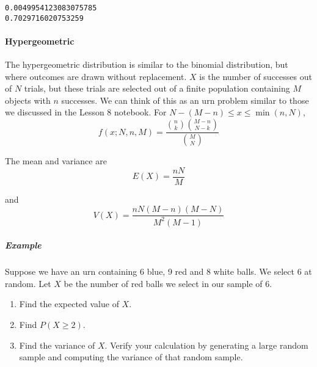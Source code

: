 \documentclass[11pt]{article}
\begin{document}
    \begin{Verbatim}[commandchars=\\\{\}]
0.0049954123083075785
0.7029716020753259

    \end{Verbatim}

    \paragraph{Hypergeometric}\label{hypergeometric}

The hypergeometric distribution is similar to the binomial distribution,
but where outcomes are drawn without replacement. \(X\) is the number of
successes out of \(N\) trials, but these trials are selected out of a
finite population containing \(M\) objects with \(n\) successes. We can
think of this as an urn problem similar to those we discussed in the
Lesson 8 notebook. For \(N-(M-n) \leq x \leq \min(n,N)\), \[
f(x;N,n,M)= \frac{{n\choose k}{{M-n}\choose {N-k}}}{M\choose N}
\]

The mean and variance are \[
E(X)=\frac{nN}{M}
\]

and \[
V(X)=\frac{nN(M-n)(M-N)}{M^2(M-1)}
\]

    \subparagraph{Example}\label{example}

Suppose we have an urn containing 6 blue, 9 red and 8 white balls. We
select 6 at random. Let \(X\) be the number of red balls we select in
our sample of 6.

\begin{enumerate}
\def\labelenumi{\arabic{enumi})}
\item
  Find the expected value of \(X\).
\item
  Find \(P(X\geq 2)\).
\item
  Find the variance of \(X\). Verify your calculation by generating a
  large random sample and computing the variance of that random sample.
\end{enumerate}
\end{document}
